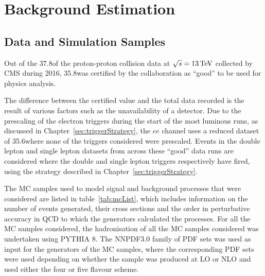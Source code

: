 \chapter{Background Estimation}\label{chapter:bkg}
%
%
%
%

\section{Data and Simulation Samples}\label{sec:samples}
Out of the 37.8\fbinv of the proton-proton collision data at $\sqrt{s} = 13\,\text{Te\hspace{-.08em}V}$ collected by CMS during 2016, 35.8\fbinv was certified by the collaboration as ``good'' to be used for physics analysis.

The difference between the certified value and the total data recorded is the result of various factors such as the unavailability of a detector.
Due to the prescaling of the electron triggers during the start of the most luminous runs, as discussed in Chapter~\ref{sec:triggerStrategy}, the $ee$ channel uses a reduced dataset of 35.6\fbinv where none of the triggers considered were prescaled.
Events in the double lepton and single lepton datasets from across these ``good'' data runs are considered where the double and single lepton triggers respectively have fired, using the strategy described in Chapter~\ref{sec:triggerStrategy}.

The MC samples used to model signal and background processes that were considered are listed in table~\ref{tab:mcList}, which includes information on the number of events generated, their cross sections and the order in perturbative accuracy in QCD to which the generators calculated the processes.
For all the MC samples considered, the hadronisation of all the MC samples considered was undertaken using PYTHIA 8.
The NNPDF3.0 family of PDF sets was used as input for the generators of the MC samples, where the corresponding PDF sets were used depending on whether the sample was produced at LO or NLO and used either the four or five flavour scheme.

